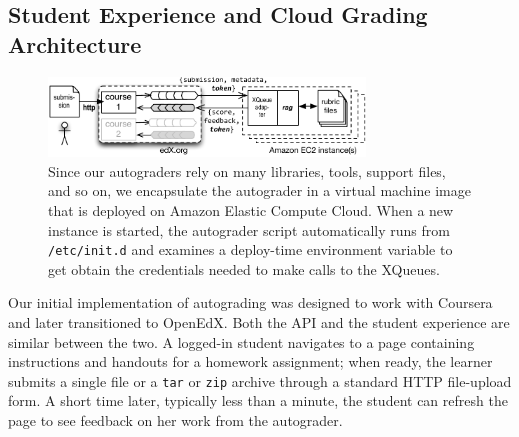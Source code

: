 \subsection{Student Experience and Cloud Grading Architecture}

\begin{figure}
  \centering
  \includegraphics[width=0.75\textwidth]{figs/autograder_arch.pdf}
  \caption{\label{fig:autograder_arch}
  Since our autograders rely on many libraries,
  tools, support files, and so on, we encapsulate the autograder in a
  virtual machine image that is deployed on Amazon Elastic Compute Cloud.
  When a new instance is started, the autograder script automatically runs from
  \texttt{/etc/init.d} and examines a deploy-time environment variable
  to get obtain the credentials needed to make calls to the XQueues.}
\end{figure}


Our initial implementation of autograding was designed to work with
Coursera and later transitioned to OpenEdX.  Both the API and the student
experience are similar 
between the two.  A logged-in student navigates to a page
containing instructions and handouts for a homework assignment;
when ready, the learner submits a single file or a
\texttt{tar} or \texttt{zip} archive through a standard HTTP
file-upload form.  A short time later, typically less than a minute, the
student can refresh the page to see feedback on her work from the
autograder.  

